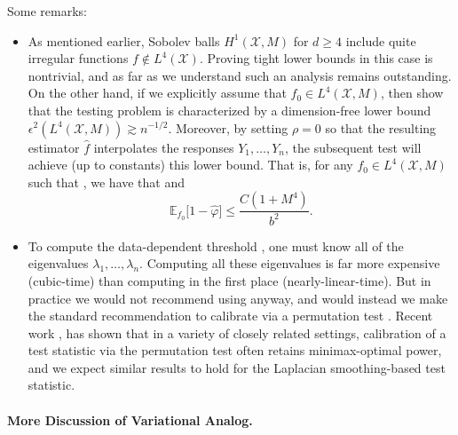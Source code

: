 \documentclass[twoside]{article}
\newcommand{\1}{\mathbf{1}}
\newcommand{\Xset}{\mathcal{X}}
\newcommand{\Leb}{L}
\newcommand{\Ebb}{\mathbb{E}}
\newcommand{\wh}[1]{\widehat{#1}}
\theoremstyle{definition}
\theoremstyle{remark}
\begin{document}
Some remarks:
\begin{itemize}
	\item As mentioned earlier, Sobolev balls $H^1(\Xset,M)$ for $d \geq 4$ include quite irregular functions $f \not\in \Leb^4(\Xset)$. Proving tight lower bounds in this case is nontrivial, and as far as we understand such an analysis remains outstanding. On the other hand, if we explicitly assume that $f_0 \in \Leb^4(\Xset,M)$, then \citet{guerre02} show that the testing problem is characterized by a dimension-free lower bound $\epsilon^{2}(\Leb^4(\Xset,M)) \gtrsim n^{-1/2}$. Moreover, by setting $\rho = 0$ so that the resulting estimator $\wh{f}$ interpolates the responses $Y_1,\ldots,Y_n$, the subsequent test \smash{$\wh{\varphi}$} will achieve (up to constants) this lower bound. That is, for any $f_0 \in \Leb^4(\Xset,M)$ such that \smash{$\|f_0\|_{\Leb^2(\Xset)}^2 \geq C(b^2 + \sqrt{1/\alpha})n^{-1/2}$}, we have that \smash{$\Ebb_0[\wh{\varphi}] \leq \alpha$} and
	\begin{equation}
	\label{eqn:laplacian_smoothing_testing_low_smoothness}
	\Ebb_{f_0}\bigl[1 - \wh{\varphi}\bigr] \leq \frac{C(1 + M^4)}{b^2}.
	\end{equation}
	\item To compute the data-dependent threshold \smash{$\wh{t}_{\alpha}$}, one must know all of the eigenvalues $\lambda_1,\ldots,\lambda_n$. Computing all these eigenvalues is far more expensive (cubic-time) than computing \smash{$\wh{T}$} in the first place (nearly-linear-time). But in practice we would not recommend using \smash{$\wh{t}_{\alpha}$} anyway, and would instead we make the standard recommendation to calibrate via a permutation test \citep{hoeffding1952}. Recent work \cite{kim2020minimax}, has shown that in a variety of closely related settings, calibration of a test statistic via the permutation test often retains minimax-optimal power, and we expect similar results to hold for the Laplacian smoothing-based test statistic.
	
\end{itemize}

\paragraph{More Discussion of Variational Analog.}
\end{document}
